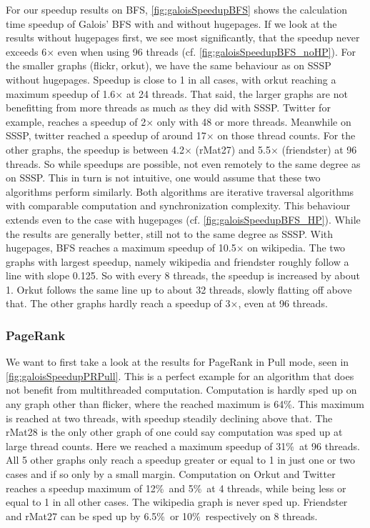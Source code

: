 For our speedup results on BFS, \autoref{fig:galoisSpeedupBFS} shows the calculation time speedup of Galois' BFS with and without hugepages.
If we look at the results without hugepages first, we see most significantly, that the speedup never exceeds 6$\times$ even when using 96 threads (cf. \autoref{fig:galoisSpeedupBFS_noHP}).
For the smaller graphs (flickr, orkut), we have the same behaviour as on SSSP without hugepages. Speedup is close to 1 in all cases, with orkut reaching a maximum speedup of 1.6$\times$ at 24 threads.
That said, the larger graphs are not benefitting from more threads as much as they did with SSSP. Twitter for example, reaches a speedup of 2$\times$ only with 48 or more threads. Meanwhile on SSSP, twitter reached a speedup of around 17$\times$ on those thread counts.
For the other graphs, the speedup is between 4.2$\times$ (rMat27) and 5.5$\times$ (friendster) at 96 threads. So while speedups are possible, not even remotely to the same degree as on SSSP. This in turn is not intuitive, one would assume that these two algorithms perform similarly. Both algorithms are iterative traversal algorithms with comparable computation and synchronization complexity.
This behaviour extends even to the case with hugepages (cf. \autoref{fig:galoisSpeedupBFS_HP}). While the results are generally better, still not to the same degree as SSSP. With hugepages, BFS reaches a maximum speedup of 10.5$\times$ on wikipedia. The two graphs with largest speedup, namely wikipedia and friendster roughly follow a line with slope 0.125. So with every 8 threads, the speedup is increased by about 1. Orkut follows the same line up to about 32 threads, slowly flatting off above that.
The other graphs hardly reach a speedup of 3$\times$, even at 96 threads.


\subsubsection{PageRank}
We want to first take a look at the results for PageRank in Pull mode, seen in \autoref{fig:galoisSpeedupPRPull}. This is a perfect example for an algorithm that does not benefit from multithreaded computation.
Computation is hardly sped up on any graph other than flicker, where the reached maximum is 64\%. This maximum is reached at two threads, with speedup steadily declining above that.
The rMat28 is the only other graph of one could say computation was sped up at large thread counts. Here we reached a maximum speedup of 31\%\ at 96 threads.
All 5 other graphs only reach a speedup greater or equal to 1 in just one or two cases and if so only by a small margin.
Computation on Orkut and Twitter reaches a speedup maximum of 12\%\ and 5\%\ at 4 threads, while being less or equal to 1 in all other cases.
The wikipedia graph is never sped up.
Friendster and rMat27 can be sped up by 6.5\%\ or 10\%\ respectively on 8 threads.

